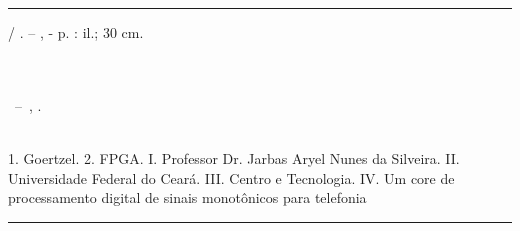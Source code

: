 \documentclass[monografia]{subfiles}
\begin{document}
	\begin{fichacatalografica}

	\rmfamily
		\vspace*{15cm}
		\hrule
		\begin{center}
			\begin{minipage}[c]{12.5cm} %
				\imprimirautor
				\hspace{0.5cm} \imprimirtitulo / \imprimirautor. --
				\imprimirlocal, \imprimirdata-
				\hspace{0.5cm} \pageref{LastPage} p. : il.; 30 cm.\\
				\hspace{0.5cm} \imprimirorientadorRotulo \imprimirorientador\\
				\hspace{0.5cm} \imprimircoorientadorRotulo \imprimircoorientador\\
				\hspace{0.5cm}
				\parbox[t]{\textwidth}{\imprimirtipotrabalho~--~\imprimirinstituicao,
				\imprimirdata.}\\
				\hspace{0.5cm}
				1. Goertzel.
				2. FPGA.
				I. Professor Dr. Jarbas Aryel Nunes da Silveira.
				II. Universidade Federal do Ceará.
				III. Centro e Tecnologia.
				IV. Um core de processamento digital de sinais monotônicos para telefonia\\
			\end{minipage}
		\end{center}
		\hrule
	\end{fichacatalografica}
	\cleardoublepage
	
\end{document}
